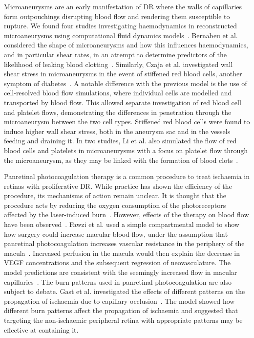 \documentclass{article}
\begin{document}
Microaneurysms are an early manifestation of DR where the walls of capillaries form outpouchings disrupting blood flow and rendering them susceptible to rupture.
We found four studies investigating haemodynamics in reconstructed microaneurysms using computational fluid dynamics models~\cite{Bernabeu_2018,Czaja_2022,Li_2020,Li_2022}.
Bernabeu et al. considered the shape of microaneurysms and how this influences haemodynamics, and in particular shear rates, in an attempt to determine predictors of the likelihood of leaking blood clotting~\cite{Bernabeu_2018}.
Similarly, Czaja et al. investigated wall shear stress in microaneurysms in the event of stiffened red blood cells, another symptom of diabetes~\cite{Czaja_2022}.
A notable difference with the previous model is the use of cell-resolved blood flow simulations, where individual cells are modelled and transported by blood flow.
This allowed separate investigation of red blood cell and platelet flows, demonstrating the differences in penetration through the microaneurysm between the two cell types.
Stiffened red blood cells were found to induce higher wall shear stress, both in the aneurysm sac and in the vessels feeding and draining it.
In two studies, Li et al. also simulated the flow of red blood cells and platelets in microaneurysms with a focus on platelet flow through the microaneurysm, as they may be linked with the formation of blood clots~\cite{Li_2020,Li_2022}.

Panretinal photocoagulation therapy is a common procedure to treat ischaemia in retinas with proliferative DR.
While practice has shown the efficiency of the procedure, its mechanisms of action remain unclear.
It is thought that the procedure acts by reducing the oxygen consumption of the photoreceptors affected by the laser-induced burn~\cite{Fawzi_2019,Gast_2016}.
However, effects of the therapy on blood flow have been observed~\cite{Fawzi_2019}.
Fawzi et al. used a simple compartmental model to show how surgery could increase macular blood flow, under the assumption that panretinal photocoagulation increases vascular resistance in the periphery of the macula~\cite{Fawzi_2019}.
Increased perfusion in the macula would then explain the decrease in VEGF concentrations and the subsequent regression of neovasculature.
The model predictions are consistent with the seemingly increased flow in macular capillaries~\cite{Fawzi_2019}.
The burn patterns used in panretinal photocoagulation are also subject to debate.
Gast et al. investigated the effects of different patterns on the propagation of ischaemia due to capillary occlusion~\cite{Gast_2016}.
The model showed how different burn patterns affect the propagation of ischaemia and suggested that targeting the non-ischaemic peripheral retina with appropriate patterns may be effective at containing it.
\end{document}
